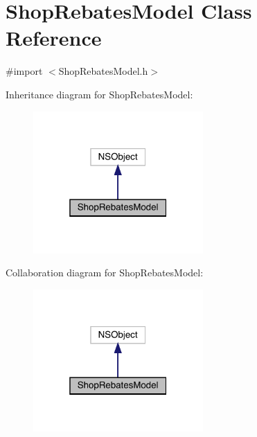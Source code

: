 \hypertarget{interface_shop_rebates_model}{}\section{Shop\+Rebates\+Model Class Reference}
\label{interface_shop_rebates_model}


{\ttfamily \#import $<$Shop\+Rebates\+Model.\+h$>$}



Inheritance diagram for Shop\+Rebates\+Model\+:\nopagebreak
\begin{figure}[H]
\begin{center}
\leavevmode
\includegraphics[width=184pt]{interface_shop_rebates_model__inherit__graph}
\end{center}
\end{figure}


Collaboration diagram for Shop\+Rebates\+Model\+:\nopagebreak
\begin{figure}[H]
\begin{center}
\leavevmode
\includegraphics[width=184pt]{interface_shop_rebates_model__coll__graph}
\end{center}
\end{figure}

